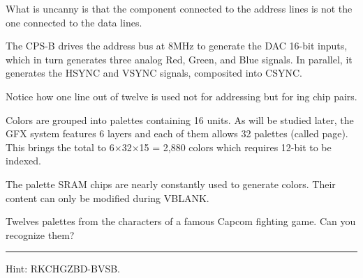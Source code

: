 What is uncanny is that the component connected to the address lines is not the one connected to the data lines.





The CPS-B drives the address bus at 8MHz to generate the DAC 16-bit inputs, which in turn generates three analog Red, Green, and Blue signals. In parallel, it generates the HSYNC and VSYNC signals, composited into CSYNC.

Notice how one line out of twelve is used not for addressing but for ing chip pairs. 








Colors are grouped into palettes containing 16 units. As will be studied later, the GFX system features 6 layers and each of them allows 32 palettes (called page). This brings the total to 6$\times$32$\times$15 = 2,880 colors which requires 12-bit to be indexed.

 The palette SRAM chips are nearly constantly used to generate colors. Their content can only be modified during VBLANK.

\pagebreak




Twelves palettes from the characters of a famous Capcom fighting game. Can you recognize them?









\par\noindent\rule{\textwidth}{0.5pt}





Hint: RKCHGZBD-BVSB.















